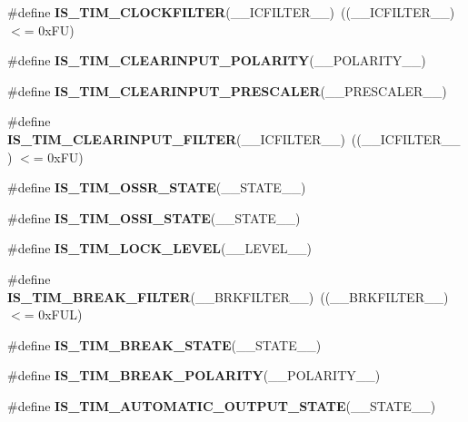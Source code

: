 \begin{DoxyCompactItemize}
\item 
\mbox{\label{group___t_i_m___private___macros_ga7e2a89ace1305fce9bec2cf6d290389f}} 
\#define {\bfseries I\+S\+\_\+\+T\+I\+M\+\_\+\+C\+L\+O\+C\+K\+F\+I\+L\+T\+ER}(\+\_\+\+\_\+\+I\+C\+F\+I\+L\+T\+E\+R\+\_\+\+\_\+)~((\+\_\+\+\_\+\+I\+C\+F\+I\+L\+T\+E\+R\+\_\+\+\_\+) $<$= 0x\+F\+U)
\item 
\#define {\bfseries I\+S\+\_\+\+T\+I\+M\+\_\+\+C\+L\+E\+A\+R\+I\+N\+P\+U\+T\+\_\+\+P\+O\+L\+A\+R\+I\+TY}(\+\_\+\+\_\+\+P\+O\+L\+A\+R\+I\+T\+Y\+\_\+\+\_\+)
\item 
\#define {\bfseries I\+S\+\_\+\+T\+I\+M\+\_\+\+C\+L\+E\+A\+R\+I\+N\+P\+U\+T\+\_\+\+P\+R\+E\+S\+C\+A\+L\+ER}(\+\_\+\+\_\+\+P\+R\+E\+S\+C\+A\+L\+E\+R\+\_\+\+\_\+)
\item 
\mbox{\label{group___t_i_m___private___macros_gaf8f726fb3929b2fe50099b21eec9a738}} 
\#define {\bfseries I\+S\+\_\+\+T\+I\+M\+\_\+\+C\+L\+E\+A\+R\+I\+N\+P\+U\+T\+\_\+\+F\+I\+L\+T\+ER}(\+\_\+\+\_\+\+I\+C\+F\+I\+L\+T\+E\+R\+\_\+\+\_\+)~((\+\_\+\+\_\+\+I\+C\+F\+I\+L\+T\+E\+R\+\_\+\+\_\+) $<$= 0x\+F\+U)
\item 
\#define {\bfseries I\+S\+\_\+\+T\+I\+M\+\_\+\+O\+S\+S\+R\+\_\+\+S\+T\+A\+TE}(\+\_\+\+\_\+\+S\+T\+A\+T\+E\+\_\+\+\_\+)
\item 
\#define {\bfseries I\+S\+\_\+\+T\+I\+M\+\_\+\+O\+S\+S\+I\+\_\+\+S\+T\+A\+TE}(\+\_\+\+\_\+\+S\+T\+A\+T\+E\+\_\+\+\_\+)
\item 
\#define {\bfseries I\+S\+\_\+\+T\+I\+M\+\_\+\+L\+O\+C\+K\+\_\+\+L\+E\+V\+EL}(\+\_\+\+\_\+\+L\+E\+V\+E\+L\+\_\+\+\_\+)
\item 
\mbox{\label{group___t_i_m___private___macros_ga6eb4b934436eb7afd965214963abfb62}} 
\#define {\bfseries I\+S\+\_\+\+T\+I\+M\+\_\+\+B\+R\+E\+A\+K\+\_\+\+F\+I\+L\+T\+ER}(\+\_\+\+\_\+\+B\+R\+K\+F\+I\+L\+T\+E\+R\+\_\+\+\_\+)~((\+\_\+\+\_\+\+B\+R\+K\+F\+I\+L\+T\+E\+R\+\_\+\+\_\+) $<$= 0x\+F\+U\+L)
\item 
\#define {\bfseries I\+S\+\_\+\+T\+I\+M\+\_\+\+B\+R\+E\+A\+K\+\_\+\+S\+T\+A\+TE}(\+\_\+\+\_\+\+S\+T\+A\+T\+E\+\_\+\+\_\+)
\item 
\#define {\bfseries I\+S\+\_\+\+T\+I\+M\+\_\+\+B\+R\+E\+A\+K\+\_\+\+P\+O\+L\+A\+R\+I\+TY}(\+\_\+\+\_\+\+P\+O\+L\+A\+R\+I\+T\+Y\+\_\+\+\_\+)
\item 
\#define {\bfseries I\+S\+\_\+\+T\+I\+M\+\_\+\+A\+U\+T\+O\+M\+A\+T\+I\+C\+\_\+\+O\+U\+T\+P\+U\+T\+\_\+\+S\+T\+A\+TE}(\+\_\+\+\_\+\+S\+T\+A\+T\+E\+\_\+\+\_\+)

\end{DoxyCompactItemize}
